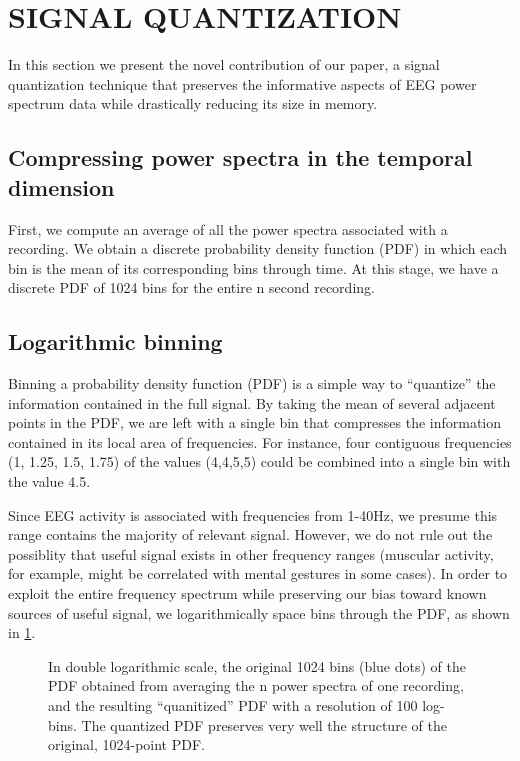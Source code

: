 
\section{\uppercase{Signal quantization}}

In this section we present the novel contribution of our paper, a signal quantization technique that preserves the informative aspects of EEG power spectrum data while drastically reducing its size in memory. 

\subsection{Compressing power spectra in the temporal dimension}

First, we compute an average of all the power spectra associated with a recording. We obtain a discrete probability density function (PDF) in which each bin is the mean of its corresponding bins through time. At this stage, we have a discrete PDF of 1024 bins for the entire n second recording. 

\subsection{Logarithmic binning}

Binning a probability density function (PDF) is a simple way to ``quantize'' the information contained in the full signal. By taking the mean of several adjacent points in the PDF, we are left with a single bin that compresses the information contained in its local area of frequencies. For instance, four contiguous frequencies (1, 1.25, 1.5, 1.75) of the values (4,4,5,5) could be combined into a single bin with the value 4.5. 

Since EEG activity is associated with frequencies from 1-40Hz, we presume this range contains the majority of relevant signal. However, we do not rule out the possiblity that useful signal exists in other frequency ranges (muscular activity, for example, might be correlated with mental gestures in some cases). In order to exploit the entire frequency spectrum while preserving our bias toward known sources of useful signal, we logarithmically space bins through the PDF, as shown in \ref{binnedEEGpowerspec}.

\begin{figure}[!h]
  \vspace{-0.2cm}
  {}
\caption{In double logarithmic scale, the original 1024 bins (blue dots) of the PDF obtained from averaging the n power spectra of one recording, and the resulting ``quanitized''  PDF with a resolution of 100 log-bins. The quantized PDF preserves very well the structure of the original, 1024-point PDF. }
\label{binnedEEGpowerspec}
\vspace{-0.1cm}
\end{figure}


